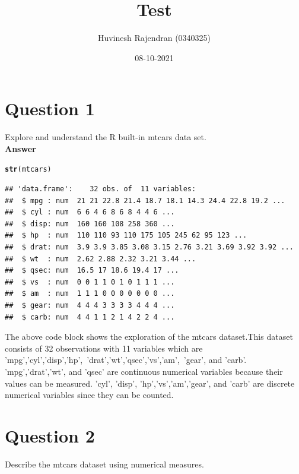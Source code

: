 \documentclass{article}\usepackage[]{graphicx}\usepackage[]{color}
\title{Test}
\author{Huvinesh Rajendran (0340325)}
\affil{Bachelor of Computer Science}
\date{08-10-2021}
\makeatletter
\newcommand{\hlstd}[1]{\textcolor[rgb]{0.345,0.345,0.345}{#1}}%
\newcommand{\hlkwd}[1]{\textcolor[rgb]{0.737,0.353,0.396}{\textbf{#1}}}%
\newenvironment{kframe}{%
 \def\at@end@of@kframe{}%
 \ifinner\ifhmode%
  \def\at@end@of@kframe{\end{minipage}}%
  \begin{minipage}{\columnwidth}%
 \fi\fi%
 \def\FrameCommand##1{\hskip\@totalleftmargin \hskip-\fboxsep
 \colorbox{shadecolor}{##1}\hskip-\fboxsep
     \hskip-\linewidth \hskip-\@totalleftmargin \hskip\columnwidth}%
 \MakeFramed {\advance\hsize-\width
   \@totalleftmargin\z@ \linewidth\hsize
   \@setminipage}}%
 {\par\unskip\endMakeFramed%
 \at@end@of@kframe}
\newenvironment{knitrout}{}{} %
\makeatother
\begin{document}
\maketitle{}


\section{Question 1}
Explore and understand the R built-in mtcars data set.\\


\textbf{Answer}\\
\begin{knitrout}
\color{fgcolor}\begin{kframe}
\begin{alltt}
\hlkwd{str}\hlstd{(mtcars)}
\end{alltt}
\begin{verbatim}
## 'data.frame':	32 obs. of  11 variables:
##  $ mpg : num  21 21 22.8 21.4 18.7 18.1 14.3 24.4 22.8 19.2 ...
##  $ cyl : num  6 6 4 6 8 6 8 4 4 6 ...
##  $ disp: num  160 160 108 258 360 ...
##  $ hp  : num  110 110 93 110 175 105 245 62 95 123 ...
##  $ drat: num  3.9 3.9 3.85 3.08 3.15 2.76 3.21 3.69 3.92 3.92 ...
##  $ wt  : num  2.62 2.88 2.32 3.21 3.44 ...
##  $ qsec: num  16.5 17 18.6 19.4 17 ...
##  $ vs  : num  0 0 1 1 0 1 0 1 1 1 ...
##  $ am  : num  1 1 1 0 0 0 0 0 0 0 ...
##  $ gear: num  4 4 4 3 3 3 3 4 4 4 ...
##  $ carb: num  4 4 1 1 2 1 4 2 2 4 ...
\end{verbatim}
\end{kframe}
\end{knitrout}

The above code block shows the exploration of the mtcars dataset.This dataset consists of 32 observations with 11 variables which are 'mpg','cyl','disp','hp',\ 'drat','wt','qsec','vs','am',\ 'gear', and 'carb'. 'mpg','drat','wt', and 'qsec' are continuous numerical variables because their values can be measured. 'cyl', 'disp', 'hp','vs','am','gear', and 'carb' are discrete numerical variables since they can be counted. 

\section{Question 2}
Describe the mtcars dataset using numerical measures.\\
\end{document}
